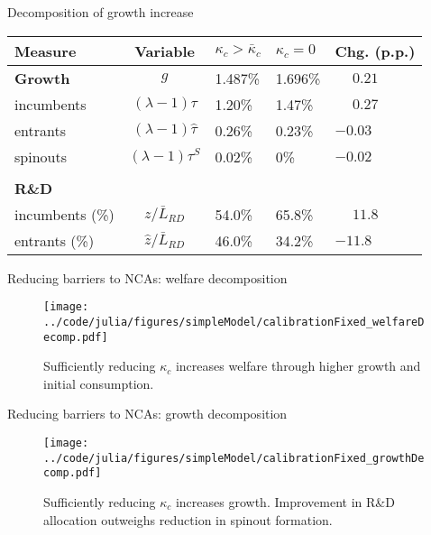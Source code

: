 \documentclass[english,usenames,dvipsnames]{beamer}
\begin{document}
\begin{frame}{Decomposition of growth increase}\label{decomposition_growth_increase}
	\hyperlink{reducing_kappa_c_table}{}
	\begin{table}
		\centering
		\footnotesize
		\begin{tabular}{lclll}
			\toprule \toprule
			Measure & Variable & $\kappa_c > \bar{\kappa}_c$ & $\kappa_c = 0$ & Chg. (p.p.) \tabularnewline
			\midrule
			\textbf{Growth} & $g$ & 1.487\% & 1.696\% & $\phantom{-}0.21$\tabularnewline
			\multicolumn{1}{l}{\quad incumbents} & $(\lambda -1) \tau$  & 1.20\% & 1.47\% & $\phantom{-}0.27$ \tabularnewline
			\multicolumn{1}{l}{\quad entrants} & $(\lambda -1) \hat{\tau}$ & 0.26\% & 0.23\% & $-0.03$ \tabularnewline
			\multicolumn{1}{l}{\quad spinouts} & $(\lambda -1) \tau^S$ & 0.02\% & 0\% & $-0.02$\tabularnewline
			\tabularnewline
			\textbf{R\&D} & & & & 
			\tabularnewline
			\multicolumn{1}{l}{\quad incumbents (\%)}  & $z / \bar{L}_{RD}$ & 54.0\% & 65.8\% & $\phantom{-}11.8$ \tabularnewline 
			
			\multicolumn{1}{l}{\quad entrants (\%)}  & $\hat{z} / \bar{L}_{RD}$ & 46.0\% & 34.2\% & $-11.8$ \tabularnewline
			\bottomrule
		\end{tabular}
	\end{table}
\end{frame}


\begin{frame}{Reducing barriers to NCAs: welfare decomposition} \label{plots:reducing_kappa_c1} 
	\hyperlink{reducing_kappa_c_table}{}
	\begin{figure}[]
		\texttt{[image: ../code/julia/figures/simpleModel/calibrationFixed\_welfareDecomp.pdf]}
		\caption{Sufficiently reducing $\kappa_c$ increases welfare through higher growth and initial consumption.}
	\end{figure}
\end{frame}

\begin{frame}{Reducing barriers to NCAs: growth decomposition} \label{plots:reducing_kappa_c2} 
	\hyperlink{reducing_kappa_c_table}{}
	\begin{figure}[]
		\texttt{[image: ../code/julia/figures/simpleModel/calibrationFixed\_growthDecomp.pdf]}
		\caption{Sufficiently reducing $\kappa_c$ increases growth. Improvement in R\&D allocation outweighs reduction in spinout formation.}
	\end{figure}
\end{frame}
\end{document}
